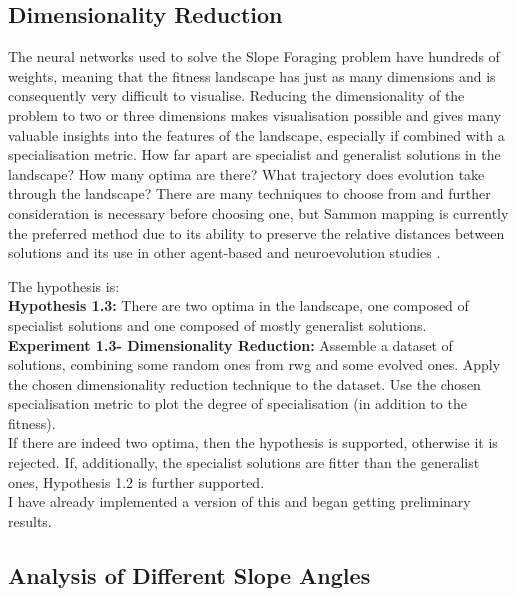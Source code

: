 \documentclass[12pt]{article}
\begin{document}
\subsection{Dimensionality Reduction}

The neural networks used to solve the Slope Foraging problem have hundreds of weights, meaning that the fitness landscape has just as many dimensions and is consequently very difficult to visualise.
Reducing the dimensionality of the problem to two or three dimensions makes visualisation possible and gives many valuable insights into the features of the landscape, especially if combined with a specialisation metric.
How far apart are specialist and generalist solutions in the landscape?
How many optima are there?
What trajectory does evolution take through the landscape?
There are many techniques to choose from \cite{veerapen:GPEM:2018} and further consideration is necessary before choosing one, but Sammon mapping \cite{sammon:IEEETR:1969} is currently the preferred method due to its ability to preserve the relative distances between solutions and its use in other agent-based and neuroevolution studies \cite{kim:GECCO:2003, risi:AB:2010}.

The hypothesis is:\\

\textbf{Hypothesis 1.3:} There are two optima in the landscape, one composed of specialist solutions and one composed of mostly generalist solutions. \\

\textbf{Experiment 1.3- Dimensionality Reduction:} Assemble a dataset of solutions, combining some random ones from rwg and some evolved ones.
Apply the chosen dimensionality reduction technique to the dataset.
Use the chosen specialisation metric to plot the degree of specialisation (in addition to the fitness).\\

If there are indeed two optima, then the hypothesis is supported, otherwise it is rejected.
If, additionally, the specialist solutions are fitter than the generalist ones, Hypothesis 1.2 is further supported.\\

I have already implemented a version of this and began getting preliminary results.

\subsection{Analysis of Different Slope Angles}
\end{document}
